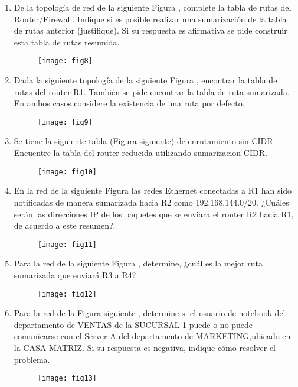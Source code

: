 \documentclass{udparticle}
\begin{document}
\begin{enumerate}
\item De la topología de red de la siguiente Figura , complete la tabla de rutas del 
Router/Firewall. Indique si es posible realizar una sumarización de la tabla 
de rutas anterior (justifique). Si su respuesta es afirmativa se pide
construir esta tabla de rutas resumida.
	\begin{figure}[H]
	\centering
	\texttt{[image: fig8]}
	\end{figure}
\item Dada la siguiente topología de la siguiente Figura , encontrar la tabla de rutas 
del router R1. También se pide encontrar la tabla de ruta sumarizada. En 
ambos casos considere la existencia de una ruta por defecto.
	\begin{figure}[H]
	\centering
	\texttt{[image: fig9]}
	\end{figure}
\item Se tiene la siguiente tabla (Figura siguiente) de enrutamiento sin CIDR. Encuentre 
la tabla del router reducida utilizando sumarizacion CIDR.
	\begin{figure}[H]
	\centering
	\texttt{[image: fig10]}
	\end{figure}
\item En la red de la siguiente Figura  las redes Ethernet conectadas a R1 han sido 
notificadas de manera sumarizada hacia R2 como 192.168.144.0/20. ¿Cuáles serán 
las direcciones IP de los paquetes que se enviara el router R2 hacia R1, de acuerdo a este resumen?.
	\begin{figure}[H]
	\centering
	\texttt{[image: fig11]}

	\end{figure}
\item Para la red de la siguiente Figura , determine, ¿cuál es la mejor ruta sumarizada que
enviará R3 a R4?.
	\begin{figure}[H]
	\centering
	\texttt{[image: fig12]}
	\end{figure}

\item Para la red de la Figura siguiente , determine si el usuario de notebook del 
departamento de VENTAS de la SUCURSAL 1 puede o no puede comunicarse con el Server 
A del departamento de MARKETING,ubicado en la CASA MATRIZ. Si su respuesta es 
negativa, indique cómo resolver el problema.
	\begin{figure}[H]
	\centering
	\texttt{[image: fig13]}
	\end{figure}


\end{enumerate}
\end{document}
